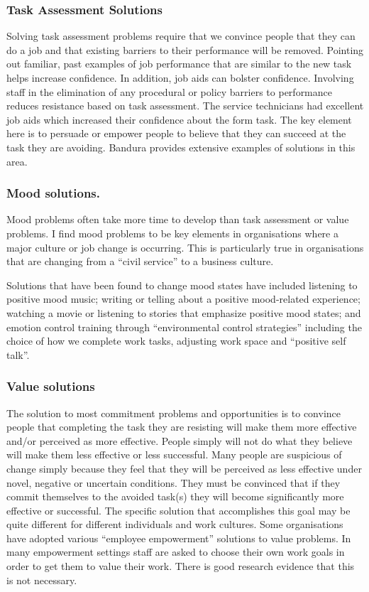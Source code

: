 \subsubsection{Task Assessment Solutions}

Solving task assessment problems require that we convince people that they can do a job and that existing barriers to their performance will be removed. Pointing out familiar, past examples of job performance that are similar to the new task helps increase confidence. In addition, job aids can bolster confidence. Involving staff in the elimination of any procedural or policy barriers to performance reduces resistance based on task assessment. The service technicians had excellent job aids which increased their confidence about the form task. The key element here is to persuade or empower people to believe that they can succeed at the task they are avoiding. Bandura provides extensive examples of solutions in this area.

\subsubsection{Mood solutions.}

Mood problems often take more time to develop than task assessment or value problems. I find mood problems to be key elements in organisations where a major culture or job change is occurring. This is particularly true in organisations that are changing from a “civil service” to a business culture.

Solutions that have been found to change mood states have included listening to positive mood music; writing or telling about a positive mood-related experience; watching a movie or listening to stories that emphasize positive mood states; and emotion control training through ``environmental control strategies'' including the choice of how we complete work tasks, adjusting work space and ``positive self talk''.

\subsubsection{Value solutions}

The solution to most commitment problems and opportunities is to convince people that completing the task they are resisting will make them more effective and/or perceived as more effective. People simply will not do what they believe will make them less effective or less successful. Many people are suspicious of change simply because they feel that they will be perceived as less effective under novel, negative or uncertain conditions. They must be convinced that if they commit themselves to the avoided task(s) they will become significantly more effective or successful. The specific solution that accomplishes this goal may be quite different for different individuals and work cultures. Some organisations have adopted various ``employee empowerment'' solutions to value problems. In many empowerment settings staff are asked to choose their own work goals in order to get them to value their work. There is good research evidence that this is not necessary.

